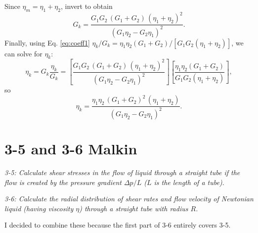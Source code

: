 \documentclass[12pt, a4paper]{article}
\numberwithin{equation}{section}
\begin{document}
Since $\eta_m=\eta_1+\eta_2$, invert to obtain
\begin{equation*}
	\boxed{
	G_k=
	\frac{G_1G_2\,(G_1+G_2)\,(\eta_1+\eta_2)^2}{(G_1\eta_2-G_2\eta_1)^2}
	}.
\end{equation*}
Finally, using Eq. \ref{eq:coeff1} $\eta_k/G_k=\eta_1\eta_2(G_1+G_2)/[G_1G_2(\eta_1+\eta_2)]$, we can solve for $\eta_k$:
\begin{equation*}
	\eta_k
	=
	G_k\frac{\eta_k}{G_k}
	=
	\left[\frac{G_1G_2\,(G_1+G_2)\,(\eta_1+\eta_2)^2}{(G_1\eta_2-G_2\eta_1)^2}\right]
	\left[\frac{\eta_1\eta_2(G_1+G_2)}{G_1G_2(\eta_1+\eta_2)}\right],
\end{equation*}
so
\begin{equation*}
	\boxed{
	\eta_k=
	\frac{\eta_1\eta_2\,(G_1+G_2)^2\,(\eta_1+\eta_2)}{(G_1\eta_2-G_2\eta_1)^2}
	}.
\end{equation*}

\section{3-5 and 3-6 Malkin}
\textit{3-5: Calculate shear stresses in the flow of liquid through a straight tube if the flow is created by the pressure gradient $\Delta p/L$ ($L$ is the length of a tube).}

\textit{3-6: Calculate the radial distribution of shear rates and flow velocity of Newtonian liquid (having viscosity $\eta$) through a straight tube with radius $R$.}

I decided to combine these because the first part of 3-6 entirely covers 3-5.
\end{document}
